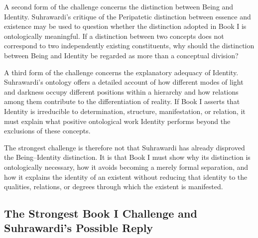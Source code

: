 \label{para:VS.B01.P01.C08.S14.SS17.P002}

A second form of the challenge
concerns the distinction
between Being and Identity.
Suhrawardi's critique of
the Peripatetic distinction
between essence and existence
may be used to question
whether the distinction
adopted in Book I is
ontologically meaningful.
If a distinction between
two concepts does not
correspond to two
independently existing
constituents, why should
the distinction between
Being and Identity be
regarded as more than
a conceptual division?

\label{para:VS.B01.P01.C08.S14.SS17.P003}

A third form of the challenge
concerns the explanatory
adequacy of Identity.
Suhrawardi's ontology
offers a detailed account
of how different modes
of light and darkness
occupy different positions
within a hierarchy and
how relations among them
contribute to the
differentiation of reality.
If Book I asserts that
Identity is irreducible
to determination, structure,
manifestation, or relation,
it must explain what
positive ontological work
Identity performs beyond
the exclusions of these
concepts.

\label{para:VS.B01.P01.C08.S14.SS17.P004}

The strongest challenge is therefore
not that Suhrawardi has
already disproved the
Being--Identity distinction.
It is that Book I must
show why its distinction
is ontologically necessary,
how it avoids becoming
a merely formal separation,
and how it explains the
identity of an existent
without reducing that
identity to the qualities,
relations, or degrees
through which the existent
is manifested.


\subsection{The Strongest Book I Challenge and Suhrawardi's Possible Reply}
\label{sec:ch08-s14-ss18}

\label{para:VS.B01.P01.C08.S14.SS18.P001}

